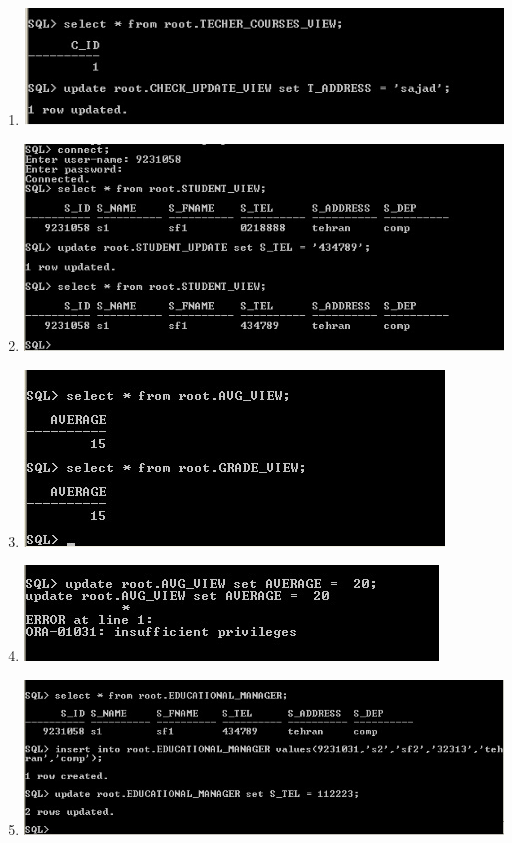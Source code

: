 \documentclass{article}
\begin{document}
\begin{enumerate}
	\item
		\includegraphics[scale=0.4]{figs/3.jpg}
	\item
		\includegraphics[scale=0.4]{figs/4.jpg}
	\item
		\includegraphics[scale=0.4]{figs/5.jpg}
	\item
		\includegraphics[scale=0.4]{figs/6.jpg}
	\item
		\includegraphics[scale=0.4]{figs/7.jpg}

\end{enumerate}
\end{document}
